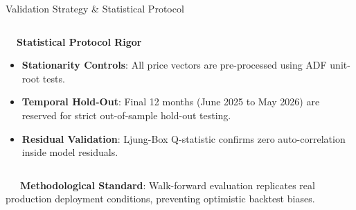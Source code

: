 \documentclass{beamer}
\begin{document}
\begin{frame}{Validation Strategy \& Statistical Protocol}
\begin{columns}[T]
    \begin{column}{0.48\textwidth}
        \begin{smallcard}[0.98\textwidth, top=3pt, bottom=3pt, left=4pt, right=4pt, boxsep=0.5pt]
            \centering \textbf{\textcolor{primaryDark}{\small {}~~Statistical Protocol Rigor}}
            \vspace{0.08cm}
            \fontsize{6.8pt}{8.2pt}\selectfont
            \begin{itemize}\setlength\itemsep{3pt}\setlength\parskip{0pt}
                \item \textbf{Stationarity Controls}: All price vectors are pre-processed using ADF unit-root tests.
                \item \textbf{Temporal Hold-Out}: Final 12 months (June 2025 to May 2026) are reserved for strict out-of-sample hold-out testing.
                \item \textbf{Residual Validation}: Ljung-Box Q-statistic confirms zero auto-correlation inside model residuals.
            \end{itemize}
        \end{smallcard}
    \end{column}
\end{columns}

\vspace{0.15cm}
\begin{tcolorbox}[enhanced, colback=primaryblue!4, colframe=primaryblue!30, boxrule=0.35pt,
  arc=3.5pt, width=0.98\textwidth, left=4pt, right=4pt, top=2.5pt, bottom=2.5pt, boxsep=0pt,
  halign=center, shadow={0.5pt}{-0.5pt}{0pt}{black!8}]
    \fontsize{5.5pt}{6.5pt}\selectfont
    \textcolor{primaryDark}{~~~\textbf{Methodological Standard}: Walk-forward evaluation replicates real production deployment conditions, preventing optimistic backtest biases.}
\end{tcolorbox}
\end{frame}
\end{document}
